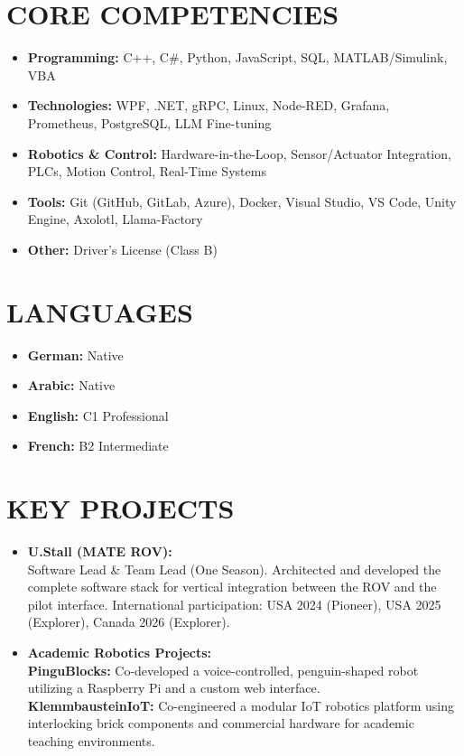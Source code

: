 \documentclass[10pt,a4paper]{article}
\begin{document}
\hfill
\begin{minipage}[t]{0.30\textwidth}

    \section*{CORE COMPETENCIES}
    \begin{itemize}
        \item \textbf{Programming:} C++, C\#, Python, JavaScript, SQL, MATLAB/Simulink, VBA
        \item \textbf{Technologies:} WPF, .NET, gRPC, Linux, Node-RED, Grafana, Prometheus, PostgreSQL, LLM Fine-tuning
        \item \textbf{Robotics \& Control:} Hardware-in-the-Loop, Sensor/Actuator Integration, PLCs, Motion Control, Real-Time Systems
        \item \textbf{Tools:} Git (GitHub, GitLab, Azure), Docker, Visual Studio, VS Code, Unity Engine, Axolotl, Llama-Factory
        \item \textbf{Other:} Driver's License (Class B)
    \end{itemize}
    
    \section*{LANGUAGES}
    \begin{itemize}
        \item \textbf{German:} Native
        \item \textbf{Arabic:} Native
        \item \textbf{English:} C1 Professional
        \item \textbf{French:} B2 Intermediate
    \end{itemize}
    
    \vspace{0.6em}
    
    \section*{KEY PROJECTS}
    \begin{itemize}
        \item \textbf{U.Stall (MATE ROV):}\\
        Software Lead \& Team Lead (One Season). Architected and developed the complete software stack for vertical integration between the ROV and the pilot interface. International participation: USA 2024 (Pioneer), USA 2025 (Explorer), Canada 2026 (Explorer).
        \vspace{0.4em}
        \item \textbf{Academic Robotics Projects:}\\
        \textbf{PinguBlocks:} Co-developed a voice-controlled, penguin-shaped robot utilizing a Raspberry Pi and a custom web interface.\\
        \textbf{KlemmbausteinIoT:} Co-engineered a modular IoT robotics platform using interlocking brick components and commercial hardware for academic teaching environments.
    \end{itemize}

\end{minipage}
\end{document}

